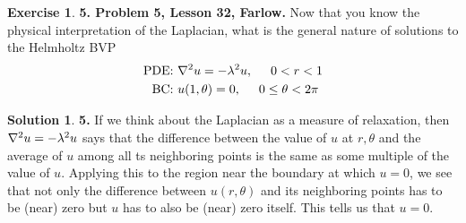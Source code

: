\documentclass{article}
\theoremstyle{definition}
\newtheorem*{exer*}{Exercise}
\newtheorem*{sln*}{Solution}
\begin{document}
\newpage

\begin{exer*}\textbf{5. Problem 5, Lesson 32, Farlow.} Now that you know the physical interpretation of the Laplacian, what is the general nature of solutions to the Helmholtz BVP
	\begin{align*}
	\text{PDE: } & \laplacian u = -\lambda^2u, \hspace{0.5cm} 0 < r< 1\\
	\text{BC: } & u(1,\theta) = 0, \hspace{0.5cm}  0 \leq \theta < 2\pi
	\end{align*} 
	
	\begin{sln*}\textbf{5.} 
		If we think about the Laplacian as a measure of relaxation, then $\laplacian u = -\lambda^2 u$ says that the difference between the value of $u$ at $r,\theta$ and the average of $u$ among all ts neighboring points is the same as some multiple of the value of $u$. Applying this to the region near the boundary at which $u = 0$, we see that not only the difference between $u(r,\theta)$ and its neighboring points has to be (near) zero but $u$ has to also be (near) zero itself. This tells us that $u= 0$. 
	\end{sln*}
\end{exer*}




\newpage
\end{document}
